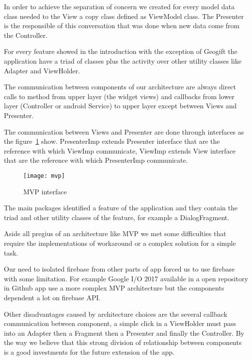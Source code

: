 In order to achieve the separation of concern we created for every model data class needed to the View a copy class defined as ViewModel class. The Presenter is the responsible of this conversation that was done when new data come from the Controller. 

For every feature showed in the introduction with the exception of Geogift the application have a triad of classes plus the activity over other utility classes like Adapter and ViewHolder. 

The communication between components of our architecture are always direct calls to method from upper layer (the widget views) and callbacks from lower layer (Controller or android Service) to upper layer except between Views and Presenter.

The communication between Views and Presenter are done through interfaces as the figure~\ref{fig:MVP_image} show. PresenterImp extends Presenter interface that are the reference with which ViewImp communicate, ViewImp extends View interface that are the reference with which PresenterImp communicate.

\begin{figure}[h]
	\texttt{[image: mvp]}
	\caption{MVP interface}
	\label{fig:MVP_image}
\end{figure}

The main packages identified a feature of the application and they contain the triad and other utility classes of the feature, for example a DialogFragment.

Aside all pregius of an architecture like MVP we met some difficulties that require the implementations of workaround or a complex solution for a simple task. 

Our need to isolated firebase from other parts of app forced us to use firebase with some limitation. For example Google I/O 2017 available in a open repository in Github \cite{GoogleIO} app use a more complex MVP architecture but the components dependent a lot on firebase API.

Other disadvantages caused by architecture choices are the several callback communication between component, a simple click in a ViewHolder must pass into an Adapter then a Fragment then a Presenter and finally the Controller. By the way we believe that this strong division of relationship between components is a good investments for the future extension of the app.


